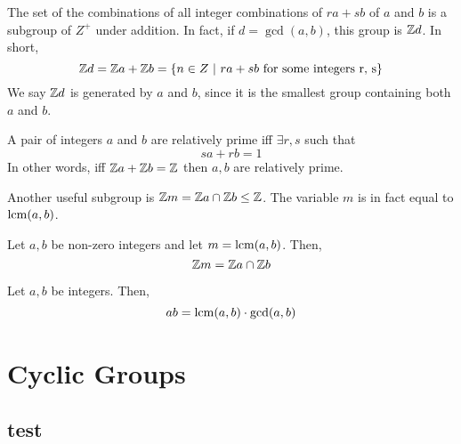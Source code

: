 \begin{theorem}
    The set of the combinations of all integer combinations of $ra + sb$ of $a$ and $b$ is a subgroup of $Z^+$ under addition. In fact, if $d
    = \gcd(a,b)$,
    this group is $\mathbb Z d$. In short,
    \[ \ZZ d = \ZZ a + \ZZ b =\{ n \in Z \ | \ ra + sb \ \text{for some integers r, s}\}\]
    We say $\mathbb Z d$ is \alert{generated} by $a$ and $b$, since it is the smallest group containing both $a$ and $b$.
\end{theorem}
\begin{corollary}
    A pair of integers $a$ and $b$ are relatively prime iff $\exists r,s$ such that
    \[ sa + rb = 1\]
    In other words, iff $\mathbb Z a + \mathbb Z b = \mathbb Z$ then $a,b$ are relatively prime.
\end{corollary}
Another useful subgroup is $\mathbb Z m = \mathbb Z a \cap \mathbb Z b \le \mathbb Z$. The variable $m$ is in fact equal to $\operatorname{lcm} (a,b)$.
\begin{theorem}
    Let $a,b$ be non-zero integers and let $m = \operatorname{lcm}(a,b)$. Then,
    \[ \mathbb Z m = \mathbb Z a \cap \mathbb Z b\]
\end{theorem}
\begin{corollary}
    Let $a,b$ be integers. Then,
    \[ ab = \operatorname{lcm}(a,b) \cdot \gcd(a,b)\]
\end{corollary}

\chapter{Cyclic Groups}
\section{test}
